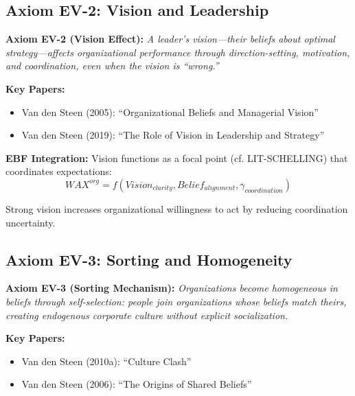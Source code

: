 \subsection{Axiom EV-2: Vision and Leadership}

\begin{tcolorbox}[colback=blue!5!white, colframe=blue!75!black]
\textbf{Axiom EV-2 (Vision Effect):}
\textit{A leader's vision---their beliefs about optimal strategy---affects
organizational performance through direction-setting, motivation, and
coordination, even when the vision is ``wrong.''}
\end{tcolorbox}

\textbf{Key Papers:}
\begin{itemize}[nosep]
    \item Van den Steen (2005): ``Organizational Beliefs and Managerial Vision''
    \item Van den Steen (2019): ``The Role of Vision in Leadership and Strategy''
\end{itemize}

\textbf{EBF Integration:}
Vision functions as a focal point (cf. LIT-SCHELLING) that coordinates expectations:
\begin{equation}
WAX^{org} = f(Vision_{clarity}, Belief_{alignment}, \gamma_{coordination})
\end{equation}

Strong vision increases organizational willingness to act by reducing coordination
uncertainty.

\subsection{Axiom EV-3: Sorting and Homogeneity}

\begin{tcolorbox}[colback=blue!5!white, colframe=blue!75!black]
\textbf{Axiom EV-3 (Sorting Mechanism):}
\textit{Organizations become homogeneous in beliefs through self-selection:
people join organizations whose beliefs match theirs, creating endogenous
corporate culture without explicit socialization.}
\end{tcolorbox}

\textbf{Key Papers:}
\begin{itemize}[nosep]
    \item Van den Steen (2010a): ``Culture Clash''
    \item Van den Steen (2006): ``The Origins of Shared Beliefs''
\end{itemize}

